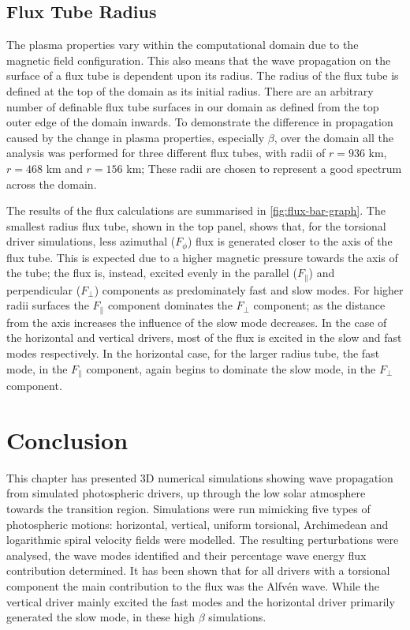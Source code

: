 \documentclass[a4paper,12pt,fourier,authoryear,custommargin]{Classes/PhDThesisPSnPDF}
\begin{document}
\subsection{Flux Tube Radius}
The plasma properties vary within the computational domain due to the magnetic field configuration.
This also means that the wave propagation on the surface of a flux tube is dependent upon its radius.
The radius of the flux tube is defined at the top of the domain as its initial radius.
There are an arbitrary number of definable flux tube surfaces in our domain as defined from the top outer edge of the domain inwards.
To demonstrate the difference in propagation caused by the change in plasma properties, especially $\beta$, over the domain all the analysis was performed for three different flux tubes, with radii of $r=936$ km, $r=468$ km and  $r=156$ km; These radii are chosen to represent a good spectrum across the domain.

The results of the flux calculations are summarised in \cref{fig:flux-bar-graph}.
The smallest radius flux tube, shown in the top panel, shows that, for the torsional driver simulations, less azimuthal ($F_\phi$) flux is generated closer to the axis of the flux tube.
This is expected due to a higher magnetic pressure towards the axis of the tube; the flux is, instead, excited evenly in the parallel ($F_\parallel$) and perpendicular ($F_\perp$) components as predominately fast and slow modes.
For higher radii surfaces the $F_\parallel$ component dominates the $F_\perp$ component; as the distance from the axis increases the influence of the slow mode decreases.
In the case of the horizontal and vertical drivers, most of the flux is excited in the slow and fast modes respectively.
In the horizontal case, for the larger radius tube, the fast mode, in the $F_\parallel$ component, again begins to dominate the slow mode, in the $F_\perp$ component.

\section{Conclusion}
This chapter has presented 3D numerical simulations showing wave propagation from simulated photospheric drivers, up through the low solar atmosphere towards the transition region.
Simulations were run mimicking five types of photospheric motions: horizontal, vertical, uniform torsional, Archimedean and logarithmic spiral velocity fields were modelled.
The resulting perturbations were analysed, the wave modes identified and their percentage wave energy flux contribution determined.
It has been shown that for all drivers with a torsional component the main contribution to the flux was the Alfv\'en wave.
While the vertical driver mainly excited the fast modes and the horizontal driver primarily generated the slow mode, in these high $\beta$ simulations.
\end{document}
